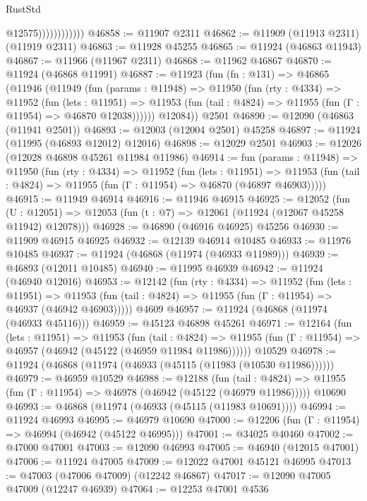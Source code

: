 \begin{lexlean}{RustStd}
\begin{coremodule}
                            @12575))))))))))))
@46858 := @11907 @2311
@46862 := @11909 (@11913 @2311) (@11919 @2311)
@46863 := @11928 @45255
@46865 := @11924 (@46863 @11943)
@46867 := @11966 (@11967 @2311)
@46868 := @11962 @46867
@46870 := @11924 (@46868 @11991)
@46887 := @11923
    (fun (fn : @131) =>
    @46865
      (@11946
        (@11949
          (fun (params : @11948) =>
          @11950
            (fun (rty : @4334) =>
            @11952
              (fun (lets : @11951) =>
              @11953 (fun (tail : @4824) => @11955 (fun (Γ : @11954) => @46870 @12038))))))
        @12084))
    @2501
@46890 := @12090 (@46863 (@11941 @2501))
@46893 := @12003 (@12004 @2501) @45258
@46897 := @11924 (@11995 (@46893 @12012) @12016)
@46898 := @12029 @2501
@46903 := @12026 (@12028 @46898 @45261 @11984 @11986)
@46914 := fun (params : @11948) =>
  @11950
    (fun (rty : @4334) =>
    @11952
      (fun (lets : @11951) =>
      @11953 (fun (tail : @4824) => @11955 (fun (Γ : @11954) => @46870 (@46897 @46903)))))
@46915 := @11949 @46914
@46916 := @11946 @46915
@46925 := @12052
    (fun (U : @12051) => @12053 (fun (t : @7) => @12061 (@11924 (@12067 @45258 @11942) @12078)))
@46928 := @46890 (@46916 @46925) @45256
@46930 := @11909 @46915 @46925
@46932 := @12139 @46914 @10485
@46933 := @11976 @10485
@46937 := @11924 (@46868 (@11974 (@46933 @11989)))
@46939 := @46893 (@12011 @10485)
@46940 := @11995 @46939
@46942 := @11924 (@46940 @12016)
@46953 := @12142
    (fun (rty : @4334) =>
    @11952
      (fun (lets : @11951) =>
      @11953 (fun (tail : @4824) => @11955 (fun (Γ : @11954) => @46937 (@46942 @46903)))))
    @4609
@46957 := @11924 (@46868 (@11974 (@46933 @45116)))
@46959 := @45123 @46898 @45261
@46971 := @12164
    (fun (lets : @11951) =>
    @11953
      (fun (tail : @4824) =>
      @11955 (fun (Γ : @11954) => @46957 (@46942 (@45122 (@46959 @11984 @11986))))))
    @10529
@46978 := @11924 (@46868 (@11974 (@46933 (@45115 (@11983 (@10530 @11986))))))
@46979 := @46959 @10529
@46988 := @12188
    (fun (tail : @4824) => @11955 (fun (Γ : @11954) => @46978 (@46942 (@45122 (@46979 @11986)))))
    @10690
@46993 := @46868 (@11974 (@46933 (@45115 (@11983 @10691))))
@46994 := @11924 @46993
@46995 := @46979 @10690
@47000 := @12206 (fun (Γ : @11954) => @46994 (@46942 (@45122 @46995)))
@47001 := @34025 @40460
@47002 := @47000 @47001
@47003 := @12090 @46993
@47005 := @46940 (@12015 @47001)
@47006 := @11924 @47005
@47009 := @12022 @47001 @45121 @46995
@47013 := @47003 (@47006 @47009) (@12242 @46867)
@47017 := @12090 @47005 @47009 (@12247 @46939)
@47064 := @12253
    @47001
    @4536

\end{coremodule}
\end{lexlean}

